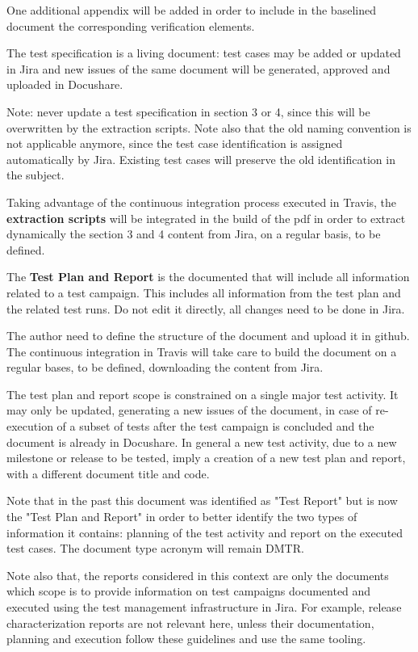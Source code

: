 One additional appendix will be added in order to include in the baselined document the corresponding verification elements.

The test specification is a living document: test cases may be added or updated in Jira and new issues of the same document will be generated, approved and uploaded in Docushare.

Note: never update a test specification in section 3 or 4, since this will be overwritten by the extraction scripts. Note also that the old naming convention is not applicable anymore, since the test case identification is assigned automatically by Jira. Existing test cases will preserve the old identification in the subject.

Taking advantage of the continuous integration process executed in Travis, the {\bf extraction scripts} will be integrated in the build of the pdf in order to extract dynamically the section 3 and 4 content from Jira, on a regular basis, to be defined.


The {\bf Test Plan and Report} is the documented that will include all information related to a test campaign.
This includes all information from the test plan and the related test runs.
Do not edit it directly, all changes need to be done in Jira.

The author need to define the structure of the document and upload it in github. The continuous integration in Travis will take care to build the document on a regular bases, to be defined, downloading the content from Jira.

The test plan and report scope is constrained on a single major test activity. It may only be updated, generating a new issues of the document, in case of re-execution of a subset of tests after the test campaign is concluded and the document is already in Docushare.
In general a new test activity, due to a new milestone or release to be tested, imply a creation of a new test plan and report, with a different document title and code.

Note that in the past this document was identified as "Test Report" but is now
the "Test Plan and Report" in order to better identify the two types of information it contains: planning of the test activity and report on the executed test cases. The document type acronym will remain DMTR.

Note also that, the reports considered in this context are only the documents which scope is to provide information on test campaigns documented and executed using the test management infrastructure in Jira. For example, release characterization reports are not relevant here, unless their documentation, planning and execution follow these guidelines and use the same tooling.


